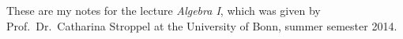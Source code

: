 \thispagestyle{plain}

These are my notes for the lecture \emph{Algebra I}, which was given by Prof.\ Dr.\ Catharina Stroppel at the University of Bonn, summer semester 2014.
